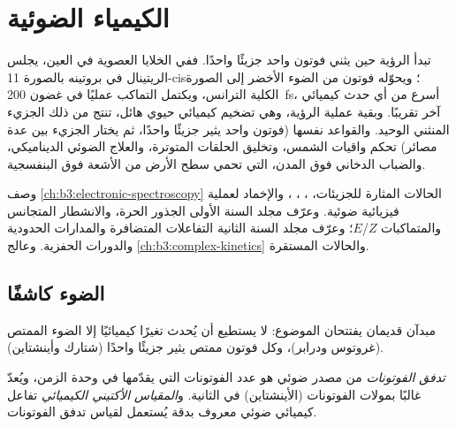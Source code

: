 \chapter{الكيمياء الضوئية}\label{ch:b3:photochemistry}

تبدأ الرؤية حين يثني فوتون واحد جزيئًا واحدًا. ففي الخلايا العصوية في العين،
يجلس الريتينال في بروتينه بالصورة 11-cis؛ ويحوّله فوتون من الضوء الأخضر
إلى الصورة الكلية الترانس، ويكتمل التماكب عمليًا
في غضون \qty{200}{fs}، أسرع من أي حدث كيميائي آخر تقريبًا. وبقية
عملية الرؤية، وهي تضخيم كيميائي حيوي هائل، تنتج من ذلك الجزيء
المنثني الوحيد. والقواعد نفسها (فوتون واحد يثير جزيئًا واحدًا، ثم يختار الجزيء
بين عدة مصائر) تحكم واقيات الشمس، وتخليق الحلقات المتوترة،
والعلاج الضوئي الديناميكي، والضباب الدخاني فوق المدن،  التي تحمي
سطح الأرض من الأشعة فوق البنفسجية.

\begin{recall}
وصف \cref{ch:b3:electronic-spectroscopy} الحالات المثارة
للجزيئات، ، ،  
، والإخماد  لعملية فيزيائية ضوئية.
وعرّف مجلد السنة الأولى الجذور الحرة، والانشطار المتجانس والمتماكبات $Z$/$E$؛ وعرّف مجلد السنة الثانية
التفاعلات المتضافرة والمدارات الحدودية والدورات الحفزية.
وعالج \cref{ch:b3:complex-kinetics}  والحالات المستقرة.
\end{recall}

\section{الضوء كاشفًا}

مبدآن قديمان يفتتحان الموضوع: لا يستطيع أن يُحدث تغيرًا كيميائيًا إلا الضوء
الممتص (غروتوس ودرابر)، وكل فوتون ممتص يثير جزيئًا
واحدًا (شتارك وأينشتاين).

\begin{definition}\label{def:b3:photochemistry:photon-flux}
\emph{تدفق الفوتونات} من مصدر ضوئي هو عدد
الفوتونات التي يقدّمها في وحدة الزمن، ويُعدّ غالبًا بمولات الفوتونات (الأينشتاين)
في الثانية. و\emph{المقياس الأكتيني الكيميائي}
تفاعل كيميائي ضوئي معروف  بدقة يُستعمل لقياس
تدفق الفوتونات.
\end{definition}

